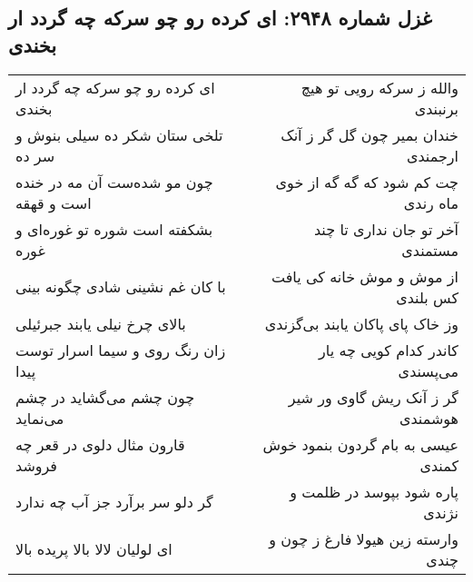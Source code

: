 \begin{center}
\section*{غزل شماره ۲۹۴۸: ای کرده رو چو سرکه چه گردد ار بخندی}
\label{sec:2948}
\begin{longtable}{l p{0.5cm} r}
ای کرده رو چو سرکه چه گردد ار بخندی
&&
والله ز سرکه رویی تو هیچ برنبندی
\\
تلخی ستان شکر ده سیلی بنوش و سر ده
&&
خندان بمیر چون گل گر ز آنک ارجمندی
\\
چون مو شده‌ست آن مه در خنده است و قهقه
&&
چت کم شود که گه گه از خوی ماه رندی
\\
بشکفته است شوره تو غوره‌ای و غوره
&&
آخر تو جان نداری تا چند مستمندی
\\
با کان غم نشینی شادی چگونه بینی
&&
از موش و موش خانه کی یافت کس بلندی
\\
بالای چرخ نیلی یابند جبرئیلی
&&
وز خاک پای پاکان یابند بی‌گزندی
\\
زان رنگ روی و سیما اسرار توست پیدا
&&
کاندر کدام کویی چه یار می‌پسندی
\\
چون چشم می‌گشاید در چشم می‌نماید
&&
گر ز آنک ریش گاوی ور شیر هوشمندی
\\
قارون مثال دلوی در قعر چه فروشد
&&
عیسی به بام گردون بنمود خوش کمندی
\\
گر دلو سر برآرد جز آب چه ندارد
&&
پاره شود بپوسد در ظلمت و نژندی
\\
ای لولیان لالا بالا پریده بالا
&&
وارسته زین هیولا فارغ ز چون و چندی
\\
\end{longtable}
\end{center}

